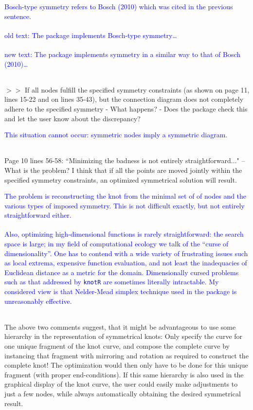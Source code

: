 \documentclass[12pt]{article}
\begin{document}
\textcolor{blue}{Bosch-type symmetry refers to Bosch (2010) which was
  cited in the previous sentence.\\ \\ old text: The package
  implements Bosch-type symmetry\ldots \\ \\ new text: The package
  implements symmetry in a similar way to that of Bosch
  (2010)\ldots\\ \\}
  
$>>$ If all nodes fulfill the specified symmetry constraints (as shown
on page 11, lines 15-22 and on lines 35-43), but the connection
diagram does not completely adhere to the specified symmetry - What
happens? - Does the package check this and let the user know about the
discrepancy?

\textcolor{blue}{This situation cannot occur: symmetric nodes imply a
  symmetric diagram.\\ \\}

Page 10 lines 56-58: ``Minimizing the badness is not entirely
straightforward..."  -- What is the problem?  I think that if all the
points are moved jointly within the specified symmetry constraints, an
optimized symmetrical solution will result.

\textcolor{blue}{The problem is reconstructing the knot from the
  minimal set of of nodes and the various types of imposed symmetry.
  This is not difficult exactly, but not entirely straightforward
  either.\\ \\ Also, optimizing high-dimensional functions is rarely
  straightforward: the search space is large; in my field of
  computational ecology we talk of the ``curse of dimensionality''.
  One has to contend with a wide variety of frustrating issues such as
  local extrema, expensive function evaluation, and not least the
  inadequacies of Euclidean distance as a metric for the domain.
  Dimensionally cursed problems such as that addressed by {\tt knotR}
  are sometimes literally intractable.  My considered view is that
  Nelder-Mead simplex technique used in the package is unreasonably
  effective.\\ \\ }

{The above two comments suggest, that it might be advantageous to use
  some hierarchy in the representation of symmetrical knots: Only
  specify the curve for one unique fragment of the knot curve, and
  compose the complete curve by instancing that fragment with
  mirroring and rotation as required to construct the complete knot!
  The optimization would then only have to be done for this unique
  fragment (with proper end-conditions).  If this same hierarchy is
  also used in the graphical display of the knot curve, the user could
  easily make adjustments to just a few nodes, while always
  automatically obtaining the desired symmetrical result.}
\end{document}
